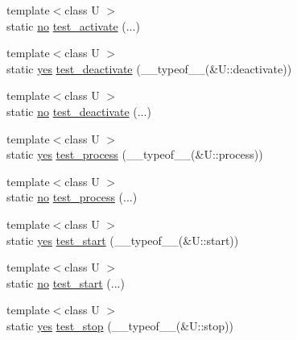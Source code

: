 \begin{DoxyCompactItemize}
\item 
{\footnotesize template$<$class U $>$ }\\static \hyperlink{structecto_1_1has__f_ae0c6da775cf20caed616e24681af2807}{no} \hyperlink{structecto_1_1has__f_a2f43dbf6bee3d172c280f00e8fe73c33}{test\-\_\-activate} (...)
\item 
{\footnotesize template$<$class U $>$ }\\static \hyperlink{structecto_1_1has__f_a3fb902f1eed02919195aff1a6b28eb76}{yes} \hyperlink{structecto_1_1has__f_ae924c11bc0462d832fdd8ea97bd3599d}{test\-\_\-deactivate} (\-\_\-\-\_\-typeof\-\_\-\-\_\-(\&U\-::deactivate))
\item 
{\footnotesize template$<$class U $>$ }\\static \hyperlink{structecto_1_1has__f_ae0c6da775cf20caed616e24681af2807}{no} \hyperlink{structecto_1_1has__f_ab8c699587d6f7d476d09b693227f5373}{test\-\_\-deactivate} (...)
\item 
{\footnotesize template$<$class U $>$ }\\static \hyperlink{structecto_1_1has__f_a3fb902f1eed02919195aff1a6b28eb76}{yes} \hyperlink{structecto_1_1has__f_a4e6f5942e9ee41196b52f7c728baf547}{test\-\_\-process} (\-\_\-\-\_\-typeof\-\_\-\-\_\-(\&U\-::process))
\item 
{\footnotesize template$<$class U $>$ }\\static \hyperlink{structecto_1_1has__f_ae0c6da775cf20caed616e24681af2807}{no} \hyperlink{structecto_1_1has__f_a75ec2b3763995883f3a5dd1b19097439}{test\-\_\-process} (...)
\item 
{\footnotesize template$<$class U $>$ }\\static \hyperlink{structecto_1_1has__f_a3fb902f1eed02919195aff1a6b28eb76}{yes} \hyperlink{structecto_1_1has__f_aa88ebe0fd23a4e875704da0d62ce489c}{test\-\_\-start} (\-\_\-\-\_\-typeof\-\_\-\-\_\-(\&U\-::start))
\item 
{\footnotesize template$<$class U $>$ }\\static \hyperlink{structecto_1_1has__f_ae0c6da775cf20caed616e24681af2807}{no} \hyperlink{structecto_1_1has__f_a089044f39fac5f7ea53eec64799c4619}{test\-\_\-start} (...)
\item 
{\footnotesize template$<$class U $>$ }\\static \hyperlink{structecto_1_1has__f_a3fb902f1eed02919195aff1a6b28eb76}{yes} \hyperlink{structecto_1_1has__f_a4de2275b91096c6e6d1efc2f137c380f}{test\-\_\-stop} (\-\_\-\-\_\-typeof\-\_\-\-\_\-(\&U\-::stop))
\item 

\end{DoxyCompactItemize}
